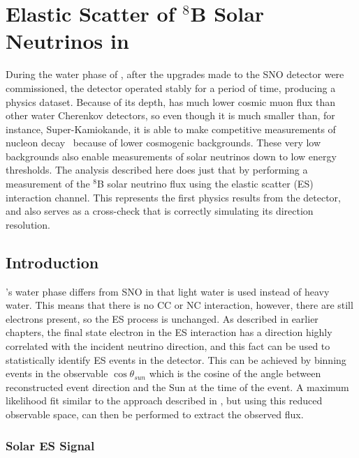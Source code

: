\chapter{Elastic Scatter of \texorpdfstring{$^8$B}{Boron-8} Solar Neutrinos in \texorpdfstring{\snop}{SNO+}}
\label{ch:es}

During the water phase of {\snop}, after the upgrades made to the SNO detector were commissioned, the detector operated stably for a period of time, producing a physics dataset.
Because of its depth, {\snop} has much lower cosmic muon flux than other water Cherenkov detectors, so even though it is much smaller than, for instance, Super-Kamiokande, it is able to make competitive measurements of nucleon decay~\cite{nucleon_decay} because of lower cosmogenic backgrounds.
These very low backgrounds also enable measurements of solar neutrinos down to low energy thresholds.
The analysis described here does just that by performing a measurement of the $^8$B solar neutrino flux using the elastic scatter (ES) interaction channel.
This represents the first physics results from the {\snop} detector, and also serves as a cross-check that {\snop} is correctly simulating its direction resolution.

\section{Introduction}
\label{sec:solar:intro}

{\snop}'s water phase differs from SNO in that light water is used instead of heavy water.
This means that there is no CC or NC interaction, however, there are still electrons present, so the ES process is unchanged.
As described in earlier chapters, the final state electron in the ES interaction has a direction highly correlated with the incident neutrino direction, and this fact can be used to statistically identify ES events in the detector.
This can be achieved by binning events in the observable $\cos{\theta_{sun}}$ which is the cosine of the angle between reconstructed event direction and the Sun at the time of the event.
A maximum likelihood fit similar to the approach described in , but using this reduced observable space, can then be performed to extract the observed flux.

\subsection{Solar ES Signal}
\label{sec:solar:inputs}

